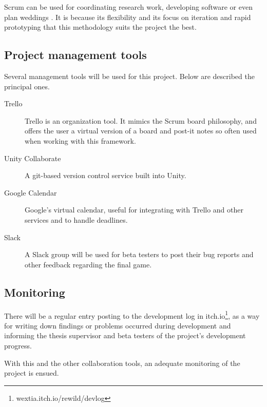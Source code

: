 Scrum can be used for coordinating research work, developing software or even plan weddings
. It is because its flexibility and its focus on iteration and rapid prototyping that this methodology suits the project the best.


\subsection{Project management tools}

Several management tools will be used for this project. Below are described the principal ones.

\begin{description}
\item[Trello]{Trello is an organization tool. It mimics the Scrum board philosophy, and offers the user a virtual version of a board and post-it notes so often used when working with this framework. }
\item[Unity Collaborate]{ A git-based version control service built into Unity. }
\item[Google Calendar]{ Google's virtual calendar, useful for integrating with Trello and other services and to handle deadlines. }
\item[Slack]{ A Slack group will be used for beta testers to post their bug reports and other feedback regarding the final game. }
\end{description}

\subsection{Monitoring}

There will be a regular entry posting to the development log in itch.io\footnote{wextia.itch.io/rewild/devlog}, as a way for writing down findings or problems occurred during development and informing the thesis supervisor and beta testers of the project's development progress. 

With this and the other collaboration tools, an adequate monitoring of the project is ensued.
